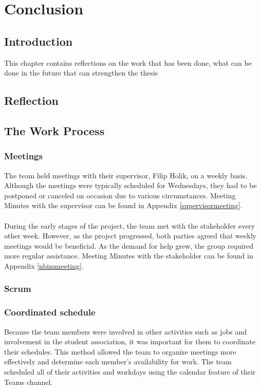 \chapter{Conclusion}
\section{Introduction}
This chapter contains reflections on the work that has been done, what can be done in the future that can strengthen the thesis

\section{Reflection}


\section{The Work Process}
\subsection{Meetings}
The team held meetings with their supervisor, Filip Holik, on a weekly basis. Although the meetings were typically scheduled for Wednesdays, they had to be postponed or canceled on occasion due to various circumstances. Meeting Minutes with the supervisor can be found in Appendix \ref{supervisormeeting}.
\\~\\
During the early stages of the project, the team met with the stakeholder every other week. However, as the project progressed, both parties agreed that weekly meetings would be beneficial. As the demand for help grew, the group required more regular assistance. Meeting Minutes with the stakeholder can be found in Appendix \ref{nbimmeeting}.  

\subsection{Scrum}


\subsection{Coordinated schedule}
Because the team members were involved in other activities such as jobs and involvement in the student association, it was important for them to coordinate their schedules. This method allowed the team to organize meetings more effectively and determine each member's availability for work. The team scheduled all of their activities and workdays using the calendar feature of their Teams channel.

